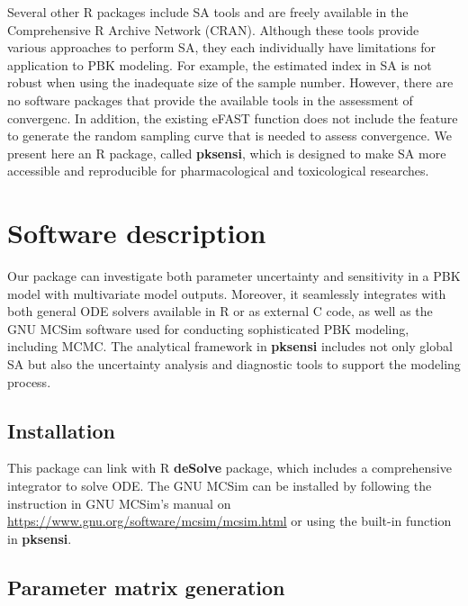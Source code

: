 \documentclass[preprint,12pt, a4paper]{elsarticle}
\begin{document}
Several other R packages include SA tools and are freely available in the Comprehensive R Archive Network (CRAN). Although these tools provide various approaches to perform SA, they each individually have limitations for application to PBK modeling. For example, the estimated index in SA is not robust when using the inadequate size of the sample number. However, there are no software packages that provide the available tools in the assessment of convergenc. In addition, the existing eFAST function does not include the feature to generate the random sampling curve that is needed to assess convergence. We present here an R package, called \textbf{pksensi}, which is designed to make SA more accessible and reproducible for pharmacological and toxicological researches. 


\section{Software description}

Our package can investigate both parameter uncertainty and sensitivity in a PBK model with multivariate model outputs. Moreover, it seamlessly integrates with both general ODE solvers available in R or as external C code, as well as the GNU MCSim software used for conducting sophisticated PBK modeling, including MCMC. The analytical framework in \textbf{pksensi} includes not only global SA but also the uncertainty analysis and diagnostic tools to support the modeling process.


\subsection{Installation}

This package can link with R \textbf{deSolve} package, which includes a comprehensive integrator to solve ODE. The GNU MCSim can be installed by following the instruction in GNU MCSim's manual on \url{https://www.gnu.org/software/mcsim/mcsim.html} or using the built-in function in \textbf{pksensi}.

\subsection{Parameter matrix generation}
\end{document}
